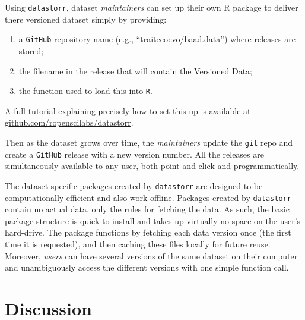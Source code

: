 \documentclass[a4paper,11pt]{article}
\newcommand{\smurl}[1]{{\footnotesize\url{#1}}}
\begin{document}
Using \texttt{datastorr}, dataset \emph{maintainers} can set up their own R package to deliver there versioned dataset simply by providing:
\begin{enumerate}
  \item a \texttt{GitHub} repository name (e.g., ``traitecoevo/baad.data'') where releases are stored;
  \item the filename in the release that will contain the Versioned Data;
  \item the function used to load this into \texttt{R}.
\end{enumerate}
A full tutorial explaining precisely how to set this up is available at \smurl{github.com/ropenscilabs/datastorr}.

Then as the dataset grows over time, the \emph{maintainers} update the \texttt{git} repo and create a \texttt{GitHub} release with a new version number. All the releases are simultaneously available to any user, both point-and-click and programmatically.

The dataset-specific packages created by \texttt{datastorr} are designed to be computationally efficient and also work offline. Packages created by \texttt{datastorr} contain no actual data, only the rules for fetching the data. As such, the basic package structure is quick to install and takes up virtually no space on the user's hard-drive. The package functions by fetching each data version once (the first time it is requested), and then caching these files locally for future reuse. Moreover, \emph{users} can have several versions of the same dataset on their computer and unambiguously access the different versions with one simple function call.

\section{Discussion}






\end{document}
